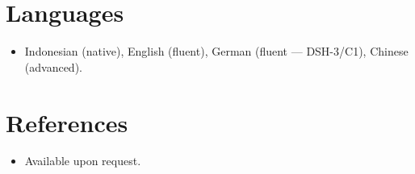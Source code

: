 \documentclass[11pt,a4paper,sans]{moderncv}
\begin{document}

\section{Languages}
\vspace{1pt}
\begin{itemize}
\item {Indonesian (native), English (fluent), German (fluent --- DSH-3/C1), Chinese (advanced).}
\end{itemize}


\section{References}
\vspace{1pt}
\begin{itemize}
\item{Available upon request.}
\end{itemize}
\end{document}
